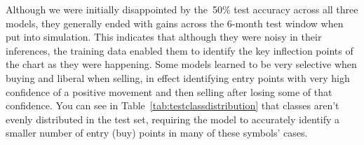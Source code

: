 \documentclass[10pt,twocolumn,letterpaper]{article}
\begin{document}
Although we were initially disappointed by the~50\% test accuracy across all three models, they generally ended with gains across the 6-month test window when put into simulation. This indicates that although they were noisy in their inferences, the training data enabled them to identify the key inflection points of the chart as they were happening. Some models learned to be very selective when buying and liberal when selling, in effect identifying entry points with very high confidence of a positive movement and then selling after losing some of that confidence. You can see in Table~\ref{tab:testclassdistribution} that classes aren't evenly distributed in the test set, requiring the model to accurately identify a smaller number of entry (buy) points in many of these symbols' cases.

\begin{table}
\begin{center}
\end{center}
\caption{Test Set Class Distribution by Symbol}
\label{tab:testclassdistribution}
\end{table}
\end{document}
